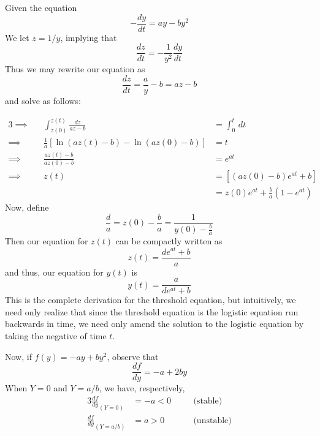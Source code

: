 \documentclass[a4paper]{article}
\begin{document}

Given the equation
\[
	-\frac{d y}{d t} = ay - by^{2}
\]
We let \(z = 1/y\), implying that
\[
	\frac{d z}{d t} = -\frac{1}{y^{2}} \frac{d y}{d t} 
\]
Thus we may rewrite our equation as
\[
	\frac{d z}{d t} = \frac{a}{y} - b = az - b
\]
and solve as follows:

\begin{alignat*}{3}
	\implies &&\int^{z \!\left( t \right) }_{z \!\left( 0 \right) } \frac{dz}{az - b}  & = \int^{t}_{0}  \, dt  \\
	\implies && \frac{1}{a} \left[ \ln\left( a z \!\left( t \right) - b \right) - \ln\left( a z \!\left( 0 \right) - b \right) \right]  & = t \\ 
	\implies && \frac{a z \!\left( t \right) - b}{a z \!\left( 0 \right) - b} & = e^{at} \\
	\implies && z \!\left( t \right) & = \left[ \!\left( a z \!\left( 0 \right) - b \right) e^{at} + b \right] \\
		 && & = z \!\left( 0 \right) e^{at} + \frac{b}{a} \!\left( 1 - e^{at} \right) 
\end{alignat*}
Now, define
\[
	\frac{d}{a} = z \!\left( 0 \right) - \frac{b}{a} = \frac{1}{y \!\left( 0 \right) - \frac{b}{a}}
\]
Then our equation for \(z \!\left( t \right) \) can be compactly written as
\[
	z \!\left( t \right) = \frac{de^{at} + b}{a}
\]
and thus, our equation for \(y \!\left( t \right) \) is
\[
	y \!\left( t \right) = \frac{a}{de^{at} + b}
\]
This is the complete derivation for the threshold equation, but intuitively, we need only realize that since the threshold equation is the logistic equation run backwards in time, we need only amend the solution to the logistic equation by taking the negative of time \(t\).

Now, if \(f \!\left( y \right) = -ay + by^{2}\), observe that
\[
	\frac{d f}{d y} = -a + 2by
\]
When \(Y = 0\) and \(Y = a/b\), we have, respectively,
\begin{alignat*}{3}
	\frac{d f}{d y}_{\!\left( Y = 0 \right) } & = - a < 0 && \quad \text{(stable)} \\
	\frac{d f}{d y}_{\!\left( Y = a/b \right) } & = a > 0 && \quad \text{(unstable)}
\end{alignat*}
\end{document}
